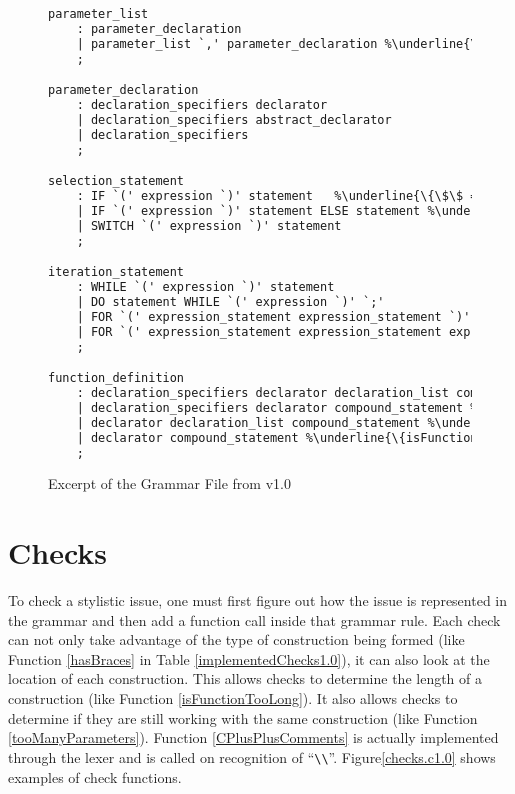 \documentclass[12pt]{report}
\def\lstlistingname{Figure}
\newcommand{\refCode}{\lstlistingname \hspace{1mm}}
\begin{document}
\begin{figure} 
\caption{Excerpt of the Grammar File from v1.0}
\label{grammar1.0}
\begin{lstlisting}[language=Caml, escapechar=\%]
parameter_list
	: parameter_declaration
	| parameter_list `,' parameter_declaration %\underline{\{tooManyParameters(@1);\}}%
	;

parameter_declaration
	: declaration_specifiers declarator
	| declaration_specifiers abstract_declarator
	| declaration_specifiers
	;

selection_statement
	: IF `(' expression `)' statement 	%\underline{\{\$\$ = IF\_SELECTION; ifHasBraces(\$5, @\$);\}}%
	| IF `(' expression `)' statement ELSE statement %\underline{\{\$\$ = IF\_ELSE\_SELECTION, ifHasBraces(\$5, @\$); ifHasBraces(\$7, @\$);\}}%
	| SWITCH `(' expression `)' statement
	;

iteration_statement
	: WHILE `(' expression `)' statement
	| DO statement WHILE `(' expression `)' `;'
	| FOR `(' expression_statement expression_statement `)' statement
	| FOR `(' expression_statement expression_statement expression `)' statement
	;

function_definition
	: declaration_specifiers declarator declaration_list compound_statement %\underline{\{isFunctionTooLong(@\$);\}}%
	| declaration_specifiers declarator compound_statement %\underline{\{isFunctionTooLong(@\$);\}}%
	| declarator declaration_list compound_statement %\underline{\{isFunctionTooLong(@\$);\}}%
	| declarator compound_statement %\underline{\{isFunctionTooLong(@\$);\}}%
	;
\end{lstlisting}
\end{figure} 
\newpage

\section{Checks}

To check a stylistic issue, one must first figure out how the issue is represented in the grammar and 
then add a function call inside that grammar rule. Each check can not only take advantage of the type 
of construction being formed (like Function \ref{hasBraces} in Table \ref{implementedChecks1.0}), it 
can also look at the location of each construction. This allows checks to determine the length of a 
construction (like Function \ref{isFunctionTooLong}). It also allows checks to determine if they are still 
working with the same construction (like Function \ref{tooManyParameters}). Function \ref{CPlusPlusComments} 
is actually implemented through the lexer and is called on recognition of ``\lstinline{\\}''. \refCode \ref{checks.c1.0} 
shows examples of check functions.
\end{document}
